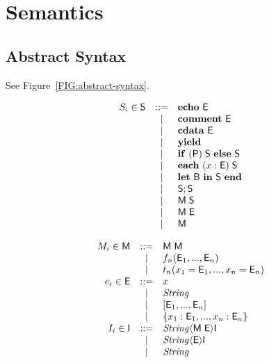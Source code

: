 \documentclass[a4paper]{article}
\def\V#1{\ensuremath{\mbox{\textit{#1}}}}
\begin{document}
\section{Semantics}


\subsection{Abstract Syntax}

See Figure~\ref{FIG:abstract-syntax}.

\def\NT#1{\ensuremath{\mathsf{#1}}}
\begin{figure}
\begin{minipage}[t]{0.33\linewidth}\small
\[
\begin{array}{rcl}
S_i \in \NT{S} & ::= & \text{\textbf{echo} }\NT{E} \\
& | & \text{\textbf{comment} }\NT{E} \\
& | & \text{\textbf{cdata} }\NT{E}\\
& | & \text{\textbf{yield}}\\
& | & \text{\textbf{if} }(\NT{P})\;\NT{S} \text{ \textbf{else} }\NT{S}\\
& | & \text{\textbf{each} }(x: \NT{E})\;\NT{S}\\
& | & \text{\textbf{let} }\NT{B}\text{ \textbf{in} }\NT{S}\text{ \textbf{end}}\\
& | & \NT{S}; \NT{S}\\
& | & \NT{M}\; \NT{S}\\
& | & \NT{M}\; \NT{E}\\
& | & \NT{M}
\end{array}
\]
\end{minipage}
\begin{minipage}[t]{0.33\linewidth}\small
\[
\begin{array}{rcl}
M_i \in\NT{M} & ::= & \NT{M}\;\NT{M}\\
& | & f_n(\NT{E}_1,...,\NT{E}_n)\\
& | & t_n(x_1 = \NT{E}_1,...,x_n =\NT{E}_n)\\
e_i \in \NT{E} & ::= & x \\
& | & \V{String} \\
& | & [\NT{E}_1,...,\NT{E}_n]\\
& | & \{x_1: \NT{E}_1, ..., x_n: \NT{E}_n\}\\
I_i\in \NT{I} & ::= & \V{String} \langle \NT{M}\; \NT{E} \rangle \NT{I}\\
  & | & \V{String} \langle \NT{E} \rangle \NT{I}\\
  & | & \V{String}

\end{array}\]
\end{minipage}
\end{figure}
\end{document}
